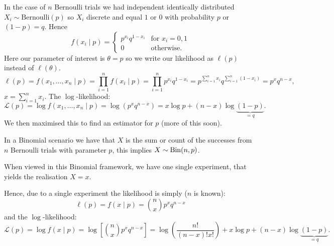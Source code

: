 \documentclass[10pt, a4paper]{article}
\begin{document}
\begin{example}
    In the case of $n$ Bernoulli trials we had independent identically distributed $X_i \sim \mathrm{Bernoulli}(p)$ so $X_i$ discrete and equal $1$ or $0$ with probability $p$ or $(1 - p) = q$.
    Hence
    \[
    f(x_i\mid p) = \begin{cases}
        p ^ {x_i}q ^ {1 - x_i} & \text{for } x_i = 0, 1 \\
        0 & \text{otherwise}.
    \end{cases}
    \]
    Here our parameter of interest is $\theta = p$ so we write our likelihood as $\ell(p)$ instead of $\ell(\theta)$.
    \[
    \ell(p) = f(x_1, \dotsc, x_n\mid p) = \prod_{i = 1}^{n}f(x_i\mid p) = \prod_{i = 1}^{n}p ^ {x_i}q ^ {1 - x_i} = p ^ {\sum_{i = 1}^{n}x_i}q ^ {\sum_{i = 1}^{n}(1 - x_i)} = p ^ xq ^ {n - x},
    \]
    $x = \sum_{i = 1}^{n}x_i$.
    The $\log$-likelihood:
    \[
    \mathcal{L}(p) = \log f(x_1, \dotsc, x_n\mid p) = \log(p ^ xq ^ {n - x}) = x\log{p} + (n - x)\log\underbrace{(1 - p)}_{= q}.
    \]
    We then maximised this to find an estimator for $p$
    (more of this soon).
\end{example}

\begin{example}
    In a Binomial scenario we have that $X$ is the sum or count of the successes from $n$ Bernoulli trials with parameter $p$,
    this implies $X \sim \operatorname{Bin}(n, p)$.

    When viewed in this Binomial framework,
    we have one single experiment,
    that yields the realisation $X = x$.

    Hence,
    due to a single experiment the likelihood is simply
    ($n$ is known):
    \[
    \ell(p) = f(x\mid p) = \binom{n}{x}p ^ xq ^ {n - x}
    \]
    and the $\log$-likelihood:
    \[
    \mathcal{L}(p) = \log{f(x\mid p)} = \log\left[\binom{n}{x}p ^ xq ^ {n - x}\right] = \log\left(\frac{n!}{(n - x)!x!}\right) + x\log{p} + (n - x)\log\underbrace{(1 - p)}_{= q}.
    \]
\end{example}
\end{document}
